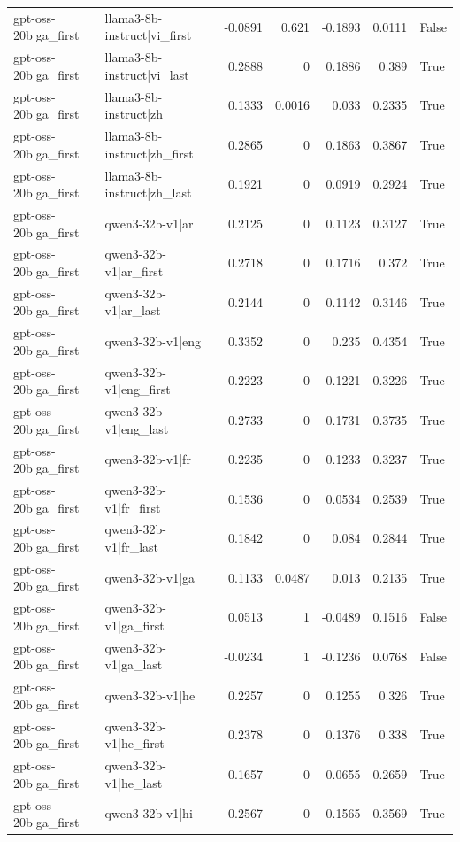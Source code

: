 \begin{table}
\begin{tabular}{l l r r r r l}
gpt-oss-20b|ga_first & llama3-8b-instruct|vi_first & -0.0891 & 0.621 & -0.1893 & 0.0111 & False \\
gpt-oss-20b|ga_first & llama3-8b-instruct|vi_last & 0.2888 & 0 & 0.1886 & 0.389 & True \\
gpt-oss-20b|ga_first & llama3-8b-instruct|zh & 0.1333 & 0.0016 & 0.033 & 0.2335 & True \\
gpt-oss-20b|ga_first & llama3-8b-instruct|zh_first & 0.2865 & 0 & 0.1863 & 0.3867 & True \\
gpt-oss-20b|ga_first & llama3-8b-instruct|zh_last & 0.1921 & 0 & 0.0919 & 0.2924 & True \\
gpt-oss-20b|ga_first & qwen3-32b-v1|ar & 0.2125 & 0 & 0.1123 & 0.3127 & True \\
gpt-oss-20b|ga_first & qwen3-32b-v1|ar_first & 0.2718 & 0 & 0.1716 & 0.372 & True \\
gpt-oss-20b|ga_first & qwen3-32b-v1|ar_last & 0.2144 & 0 & 0.1142 & 0.3146 & True \\
gpt-oss-20b|ga_first & qwen3-32b-v1|eng & 0.3352 & 0 & 0.235 & 0.4354 & True \\
gpt-oss-20b|ga_first & qwen3-32b-v1|eng_first & 0.2223 & 0 & 0.1221 & 0.3226 & True \\
gpt-oss-20b|ga_first & qwen3-32b-v1|eng_last & 0.2733 & 0 & 0.1731 & 0.3735 & True \\
gpt-oss-20b|ga_first & qwen3-32b-v1|fr & 0.2235 & 0 & 0.1233 & 0.3237 & True \\
gpt-oss-20b|ga_first & qwen3-32b-v1|fr_first & 0.1536 & 0 & 0.0534 & 0.2539 & True \\
gpt-oss-20b|ga_first & qwen3-32b-v1|fr_last & 0.1842 & 0 & 0.084 & 0.2844 & True \\
gpt-oss-20b|ga_first & qwen3-32b-v1|ga & 0.1133 & 0.0487 & 0.013 & 0.2135 & True \\
gpt-oss-20b|ga_first & qwen3-32b-v1|ga_first & 0.0513 & 1 & -0.0489 & 0.1516 & False \\
gpt-oss-20b|ga_first & qwen3-32b-v1|ga_last & -0.0234 & 1 & -0.1236 & 0.0768 & False \\
gpt-oss-20b|ga_first & qwen3-32b-v1|he & 0.2257 & 0 & 0.1255 & 0.326 & True \\
gpt-oss-20b|ga_first & qwen3-32b-v1|he_first & 0.2378 & 0 & 0.1376 & 0.338 & True \\
gpt-oss-20b|ga_first & qwen3-32b-v1|he_last & 0.1657 & 0 & 0.0655 & 0.2659 & True \\
gpt-oss-20b|ga_first & qwen3-32b-v1|hi & 0.2567 & 0 & 0.1565 & 0.3569 & True \\

\end{tabular}
\end{table}

